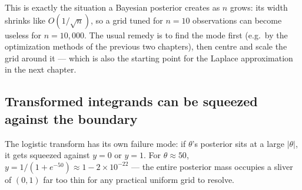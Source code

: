 \documentclass[
  letterpaper,
  DIV=11,
  numbers=noendperiod]{scrreprt}
\begin{document}
This is exactly the situation a Bayesian posterior creates as \(n\)
grows: its width shrinks like \(O(1/\sqrt n)\), so a grid tuned for
\(n=10\) observations can become useless for \(n=10{,}000\). The usual
remedy is to find the mode first (e.g.~by the optimization methods of
the previous two chapters), then centre and scale the grid around it ---
which is also the starting point for the Laplace approximation in the
next chapter.

\subsection{Transformed integrands can be squeezed against the
boundary}\label{transformed-integrands-can-be-squeezed-against-the-boundary}

The logistic transform has its own failure mode: if \(\theta\)'s
posterior sits at a large \(|\theta|\), it gets squeezed against \(y=0\)
or \(y=1\). For \(\theta \approx 50\),
\(y = 1/(1+e^{-50}) \approx 1 - 2\times 10^{-22}\) --- the entire
posterior mass occupies a sliver of \((0,1)\) far too thin for any
practical uniform grid to resolve.
\end{document}
